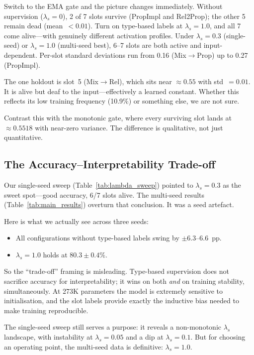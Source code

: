 \documentclass[conference]{IEEEtran}
\begin{document}
Switch to the EMA gate and the picture changes immediately.
Without supervision ($\lambda_s{=}0$), 2 of 7 slots survive
(PropImpl and Rel2Prop); the other 5 remain dead
(mean~$< 0.01$). Turn on type-based labels at $\lambda_s{=}1.0$,
and all 7 come alive---with genuinely different activation
profiles.  Under $\lambda_s{=}0.3$ (single-seed) or
$\lambda_s{=}1.0$ (multi-seed best), 6--7 slots are both active
and input-dependent. Per-slot standard deviations run from 0.16
(Mix$\to$Prop) up to 0.27 (PropImpl).

The one holdout is slot~5 (Mix$\to$Rel), which sits near
$\approx 0.55$ with std~$= 0.01$. It is alive but deaf to the
input---effectively a learned constant. Whether this reflects its
low training frequency (10.9\%) or something else, we are not
sure.

Contrast this with the monotonic gate, where every surviving
slot lands at $\approx 0.5518$ with near-zero variance. The
difference is qualitative, not just quantitative.

\subsection{The Accuracy--Interpretability Trade-off}
\label{sec:tradeoff}

Our single-seed sweep (Table~\ref{tab:lambda_sweep}) pointed to
$\lambda_s{=}0.3$ as the sweet spot---good accuracy, 6/7 slots
alive. The multi-seed results (Table~\ref{tab:main_results})
overturn that conclusion. It was a seed artefact.

Here is what we actually see across three seeds:
\begin{itemize}[nosep]
    \item All configurations without type-based labels swing by
          $\pm 6.3$--$6.6$~pp.
    \item $\lambda_s{=}1.0$ holds at $80.3 \pm 0.4\%$.
\end{itemize}

So the ``trade-off'' framing is misleading. Type-based supervision
does not sacrifice accuracy for interpretability; it wins on both
\emph{and} on training stability, simultaneously. At 273K
parameters the model is extremely sensitive to initialisation, and
the slot labels provide exactly the inductive bias needed to make
training reproducible.

The single-seed sweep still serves a purpose: it reveals a
non-monotonic $\lambda_s$ landscape, with instability at
$\lambda_s{=}0.05$ and a dip at $\lambda_s{=}0.1$. But for
choosing an operating point, the multi-seed data is definitive:
$\lambda_s{=}1.0$.
\end{document}
